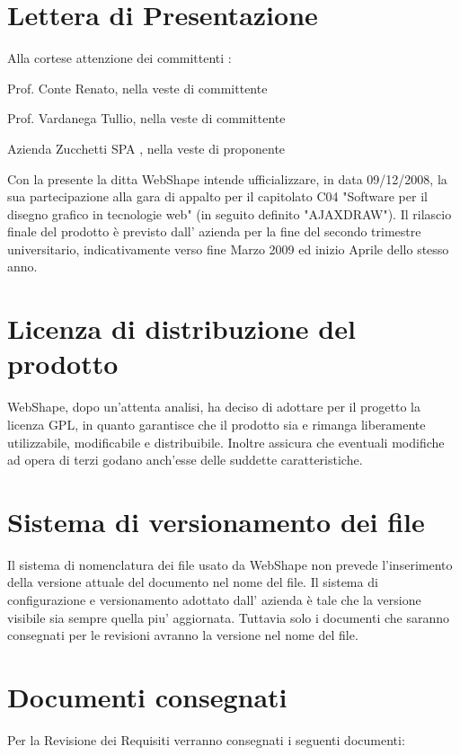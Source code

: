 \newpage

\section{Lettera di Presentazione}

Alla cortese attenzione dei committenti :
\begin{list}{-}{}
\item Prof. Conte Renato, nella veste di committente
\item Prof. Vardanega Tullio, nella veste di committente
\item Azienda Zucchetti SPA , nella veste di proponente
\end{list}

Con la presente la ditta WebShape intende ufficializzare, in data 09/12/2008, la sua partecipazione alla gara di appalto per il capitolato C04 "Software per il disegno grafico in tecnologie web" (in seguito definito "AJAXDRAW"). Il rilascio finale del prodotto \`e previsto dall' azienda per la fine del secondo trimestre universitario, indicativamente verso fine Marzo 2009 ed inizio Aprile dello stesso anno. 

\section{Licenza di distribuzione del prodotto} 
WebShape, dopo un'attenta analisi, ha deciso di adottare per il progetto la licenza GPL, in quanto garantisce che il prodotto sia e rimanga liberamente utilizzabile, modificabile e distribuibile. Inoltre assicura che eventuali modifiche ad opera di terzi godano anch'esse delle suddette caratteristiche.

\section{Sistema di versionamento dei file} 
Il sistema di nomenclatura dei file usato da WebShape non prevede l'inserimento della versione attuale del documento nel nome del file. Il sistema di configurazione e versionamento adottato dall' azienda \`e tale che la versione visibile sia sempre quella piu' aggiornata. Tuttavia solo i documenti che saranno consegnati per le revisioni avranno la versione nel nome del file. 

\section{Documenti consegnati}
Per la Revisione dei Requisiti verranno consegnati i seguenti documenti: 
